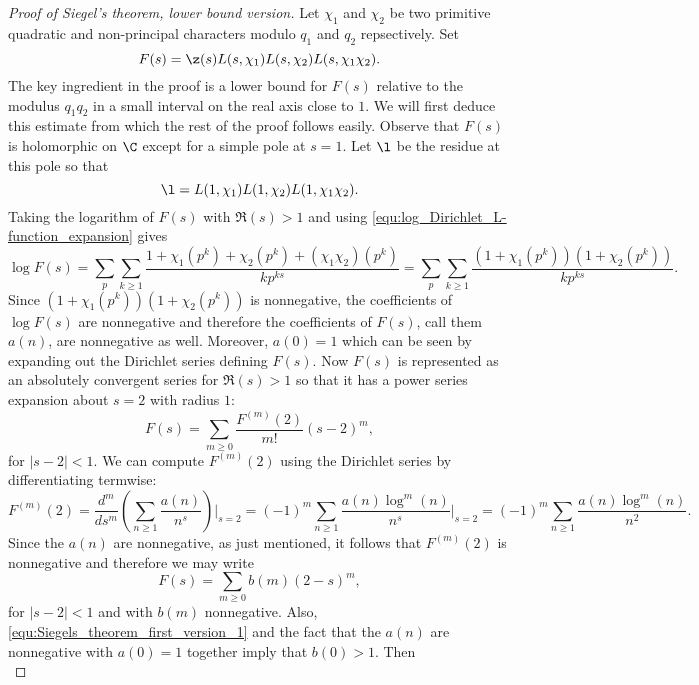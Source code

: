       \begin{proof}[Proof of Siegel's theorem, lower bound version]
        Let $\chi_{1}$ and $\chi_{2}$ be two primitive quadratic and non-principal characters modulo $q_{1}$ and $q_{2}$ repsectively. Set
        \[
          F(s) = \z(s)L(s,\chi_{1})L(s,\chi_{2})L(s,\chi_{1}\chi_{2}).
        \]
        The key ingredient in the proof is a lower bound for $F(s)$ relative to the modulus $q_{1}q_{2}$ in a small interval on the real axis close to $1$. We will first deduce this estimate from which the rest of the proof follows easily. Observe that $F(s)$ is holomorphic on $\C$ except for a simple pole at $s = 1$. Let $\l$ be the residue at this pole so that
        \[
          \l = L(1,\chi_{1})L(1,\chi_{2})L(1,\chi_{1}\chi_{2}).
        \]
        Taking the logarithm of $F(s)$ with $\Re(s) > 1$ and using \cref{equ:log_Dirichlet_L-function_expansion} gives
        \[
          \log F(s) = \sum_{p}\sum_{k \ge 1}\frac{1+\chi_{1}(p^{k})+\chi_{2}(p^{k})+(\chi_{1}\chi_{2})(p^{k})}{kp^{ks}} = \sum_{p}\sum_{k \ge 1}\frac{(1+\chi_{1}(p^{k}))(1+\chi_{2}(p^{k}))}{kp^{ks}}.
        \]
        Since $(1+\chi_{1}(p^{k}))(1+\chi_{2}(p^{k}))$ is nonnegative, the coefficients of $\log F(s)$ are nonnegative and therefore the coefficients of $F(s)$, call them $a(n)$, are nonnegative as well. Moreover, $a(0) = 1$ which can be seen by expanding out the Dirichlet series defining $F(s)$. Now $F(s)$ is represented as an absolutely convergent series for $\Re(s) > 1$ so that it has a power series expansion about $s = 2$ with radius $1$:
        \[
          F(s) = \sum_{m \ge 0}\frac{F^{(m)}(2)}{m!}(s-2)^{m},
        \]
        for $|s-2| < 1$. We can compute $F^{(m)}(2)$ using the Dirichlet series by differentiating termwise:
        \begin{equation}\label{equ:Siegels_theorem_first_version_1}
          F^{(m)}(2) = \frac{d^{m}}{ds^{m}}\left(\sum_{n \ge 1}\frac{a(n)}{n^{s}}\right)\Bigg|_{s = 2} = (-1)^{m}\sum_{n \ge 1}\frac{a(n)\log^{m}(n)}{n^{s}}\Bigg|_{s = 2} = (-1)^{m}\sum_{n \ge 1}\frac{a(n)\log^{m}(n)}{n^{2}}.
        \end{equation}
        Since the $a(n)$ are nonnegative, as just mentioned, it follows that $F^{(m)}(2)$ is nonnegative and therefore we may write
        \[
          F(s) = \sum_{m \ge 0}b(m)(2-s)^{m},
        \]
        for $|s-2| < 1$ and with $b(m)$ nonnegative. Also, \cref{equ:Siegels_theorem_first_version_1} and the fact that the $a(n)$ are nonnegative with $a(0) = 1$ together imply that $b(0) > 1$. Then
        \begin{equation}\label{equ:Siegels_theorem_first_version_2}

\end{equation}
\end{proof}
